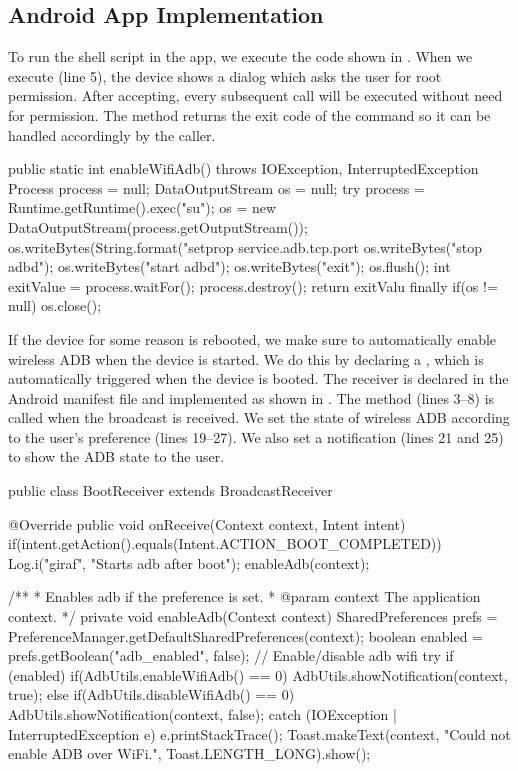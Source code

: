 \subsection{Android App Implementation}
To run the shell script in the app, we execute the code shown in . When we execute  (line 5), the device shows a dialog which asks the user for root permission. After accepting, every subsequent  call will be executed without need for permission. The method returns the exit code of the command so it can be handled accordingly by the caller.
\begin{javacode}[float,label=lst:android_app_shell,caption=Enable wireless ADB in Android]
public static int enableWifiAdb() throws IOException, InterruptedException {
  Process process = null;
  DataOutputStream os = null;
  try {
    process = Runtime.getRuntime().exec("su");
    os = new DataOutputStream(process.getOutputStream());
    os.writeBytes(String.format("setprop service.adb.tcp.port %
    os.writeBytes("stop adbd\n");
    os.writeBytes("start adbd\n");
    os.writeBytes("exit\n");
    os.flush();
    int exitValue = process.waitFor();
    process.destroy();
    return exitValu
  } finally {
    if(os != null) {
      os.close();
    }
  }
}
\end{javacode}
If the device for some reason is rebooted, we make sure to automatically enable wireless ADB when the device is started. We do this by declaring a , which is automatically triggered when the device is booted. The receiver is declared in the Android manifest file and implemented as shown in . The  method (lines 3--8) is called when the broadcast is received. We set the state of wireless ADB according to the user's preference (lines 19--27). We also set a notification (lines 21 and 25) to show the ADB state to the user.

\begin{javacode}[float,label=lst:android_app_broadcast_receiver,caption=Android boot broadcast receiver]
public class BootReceiver extends BroadcastReceiver {
  @Override
  public void onReceive(Context context, Intent intent) {
    if(intent.getAction().equals(Intent.ACTION_BOOT_COMPLETED)) {
      Log.i("giraf", "Starts adb after boot");
      enableAdb(context);
    }
  }


  /**
  * Enables adb if the preference is set.
  * @param context The application context.
  */
  private void enableAdb(Context context) {
    SharedPreferences prefs = PreferenceManager.getDefaultSharedPreferences(context);
    boolean enabled = prefs.getBoolean("adb_enabled", false);
    // Enable/disable adb wifi
    try {
      if (enabled) {
        if(AdbUtils.enableWifiAdb() == 0) {
          AdbUtils.showNotification(context, true);
        }
      } else {
        if(AdbUtils.disableWifiAdb() == 0) {
          AdbUtils.showNotification(context, false);
        }
      }
    } catch (IOException | InterruptedException e) {
      e.printStackTrace();
      Toast.makeText(context, "Could not enable ADB over WiFi.", Toast.LENGTH_LONG).show();
    }
  }
}
\end{javacode}

